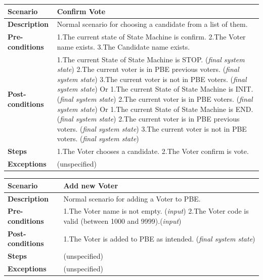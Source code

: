 \documentclass{article}
\begin{document}
\begin{center}
    \begin{tabular}{ | l | p{9cm} |}
    \hline
   \textbf{Scenario}	& \textbf{Confirm Vote}  \\ \hline
    \textbf{Description}	& Normal scenario for choosing a candidate from a list of them.\\ \hline
   \textbf{Pre-conditions}	& 1.The current state of State Machine is confirm.\linebreak
2.The Voter name exists.\linebreak
3.The Candidate name exists.

\\ \hline
 \textbf{Post-conditions} & 1.The current State of State Machine is STOP. (\textit{final system state})\linebreak
2.The current voter is in PBE previous voters. (\textit{final system state})\linebreak
3.The current voter is not in PBE voters. (\textit{final system state})\linebreak
Or\linebreak
1.The current State of State Machine is INIT. (\textit{final system state})\linebreak
2.The current voter is in PBE voters. (\textit{final system state})\linebreak
Or\linebreak
1.The current State of State Machine is END. (\textit{final system state})\linebreak
2.The current voter is in PBE previous voters. (\textit{final system state})\linebreak
3.The current voter is not in PBE voters. (\textit{final system state})
   \\ \hline
   \textbf{Steps} &1.The Voter chooses a candidate.\linebreak
2.The Voter confirm is vote.
 \\ 
    \hline
\textbf{Exceptions}& 	(unspecified)
 \\ 
    \hline
    \end{tabular}
\end{center}

\begin{center}
    \begin{tabular}{ | l | p{9cm} |}
    \hline
   \textbf{Scenario}	& \textbf{Add new Voter }  \\ \hline
    \textbf{Description}	&Normal scenario for adding a Voter to PBE.\\ \hline
   \textbf{Pre-conditions}	&1.The Voter name is not empty. (\textit{input})\linebreak
2.The Voter code is valid (between 1000 and 9999).(\textit{input})
\\ \hline
 \textbf{Post-conditions} & 1.The Voter is added to PBE as intended. (\textit{final system state}) \\ \hline
   \textbf{Steps} &  (unspecified)
 \\ 
    \hline
\textbf{Exceptions}& 	(unspecified)
 \\ 
    \hline
    \end{tabular}
\end{center}
\end{document}
